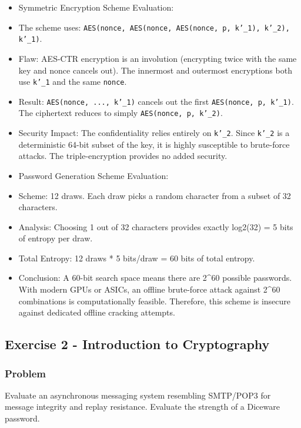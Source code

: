 \documentclass{article}
\begin{document}
\begin{itemize}
    \item[\textbf{1.}] Symmetric Encryption Scheme Evaluation:
    \item The scheme uses: \texttt{AES(nonce, AES(nonce, AES(nonce, p, k'\_1), k'\_2), k'\_1)}.
    \item Flaw: AES-CTR encryption is an involution (encrypting twice with the same key and nonce cancels out). The innermost and outermost encryptions both use \texttt{k'\_1} and the same \texttt{nonce}.
    \item Result: \texttt{AES(nonce, ..., k'\_1)} cancels out the first \texttt{AES(nonce, p, k'\_1)}. The ciphertext reduces to simply \texttt{AES(nonce, p, k'\_2)}.
    \item Security Impact: The confidentiality relies entirely on \texttt{k'\_2}. Since \texttt{k'\_2} is a deterministic 64-bit subset of the key, it is highly susceptible to brute-force attacks. The triple-encryption provides no added security.

    \item[\textbf{2.}] Password Generation Scheme Evaluation:
    \item Scheme: 12 draws. Each draw picks a random character from a subset of 32 characters.
    \item Analysis: Choosing 1 out of 32 characters provides exactly log2(32) = 5 bits of entropy per draw.
    \item Total Entropy: 12 draws * 5 bits/draw = 60 bits of total entropy.
    \item Conclusion: A 60-bit search space means there are 2\textasciicircum{}60 possible passwords. With modern GPUs or ASICs, an offline brute-force attack against 2\textasciicircum{}60 combinations is computationally feasible. Therefore, this scheme is insecure against dedicated offline cracking attempts.
\end{itemize}

\subsection{Exercise 2 - Introduction to Cryptography}
\subsubsection*{Problem}
Evaluate an asynchronous messaging system resembling SMTP/POP3 for message integrity and replay resistance. Evaluate the strength of a Diceware password.
\end{document}
